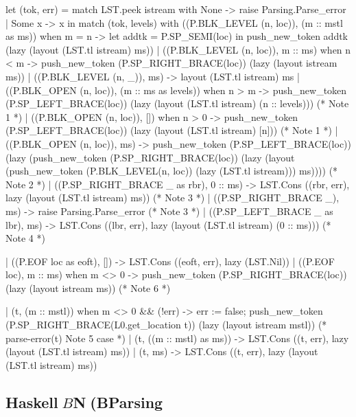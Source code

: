\documentclass[mingoth,a4paper]{jsarticle}
\begin{document}
{{{{{{\begin{commandline}
  let (tok, err) =
    match LST.peek istream with
        None -> raise Parsing.Parse_error
      | Some x -> x
  in
    match (tok, levels) with
        ((P.BLK_LEVEL (n, loc)), (m :: mstl as ms)) when m = n ->
          let addtk = P.SP_SEMI(loc) in
            push_new_token addtk (lazy (layout (LST.tl istream) ms))
      | ((P.BLK_LEVEL (n, loc)), m :: ms) when n < m  ->
          push_new_token (P.SP_RIGHT_BRACE(loc)) (lazy (layout istream ms))
      | ((P.BLK_LEVEL (n, _)), ms)                         -> layout (LST.tl istream) ms
      | ((P.BLK_OPEN (n, loc)), (m :: ms as levels)) when n > m  ->
          push_new_token (P.SP_LEFT_BRACE(loc)) (lazy (layout (LST.tl istream) (n :: levels))) (* Note 1 *)
      | ((P.BLK_OPEN (n, loc)), []) when n > 0             ->
          push_new_token (P.SP_LEFT_BRACE(loc)) (lazy (layout (LST.tl istream) [n])) (* Note 1 *)
      | ((P.BLK_OPEN (n, loc)), ms)                        ->
          push_new_token
            (P.SP_LEFT_BRACE(loc))
            (lazy (push_new_token
                     (P.SP_RIGHT_BRACE(loc))
                     (lazy (layout (push_new_token
                                      (P.BLK_LEVEL(n, loc))
                                      (lazy (LST.tl istream))) ms)))) (* Note 2 *)
      | ((P.SP_RIGHT_BRACE _ as rbr), 0 :: ms)        ->
          LST.Cons ((rbr, err), lazy (layout (LST.tl istream) ms)) (* Note 3 *)
      | ((P.SP_RIGHT_BRACE _), ms)                   -> raise Parsing.Parse_error (* Note 3 *)
      | ((P.SP_LEFT_BRACE _ as lbr), ms)             -> 
          LST.Cons ((lbr, err), lazy (layout (LST.tl istream) (0 :: ms))) (* Note 4 *)

      | ((P.EOF loc as eoft), [])                    -> LST.Cons ((eoft, err), lazy (LST.Nil))
      | ((P.EOF loc), m :: ms) when m <> 0           -> 
          push_new_token (P.SP_RIGHT_BRACE(loc)) (lazy (layout istream ms)) (* Note 6 *)

      | (t, (m :: mstl)) when m <> 0 && (!err)       ->
          err := false;
          push_new_token (P.SP_RIGHT_BRACE(L0.get_location t)) (lazy (layout istream mstl))
          (* parse-error(t) Note 5 case *)
      | (t, ((m :: mstl) as ms))                   ->
          LST.Cons ((t, err),
                   lazy (layout (LST.tl istream) ms))
      | (t, ms)                                    ->
          LST.Cons ((t, err),
                   lazy (layout (LST.tl istream) ms))
\end{commandline}

\subsection{Haskell$B$N(BParsing}

}}}}}}
\end{document}
